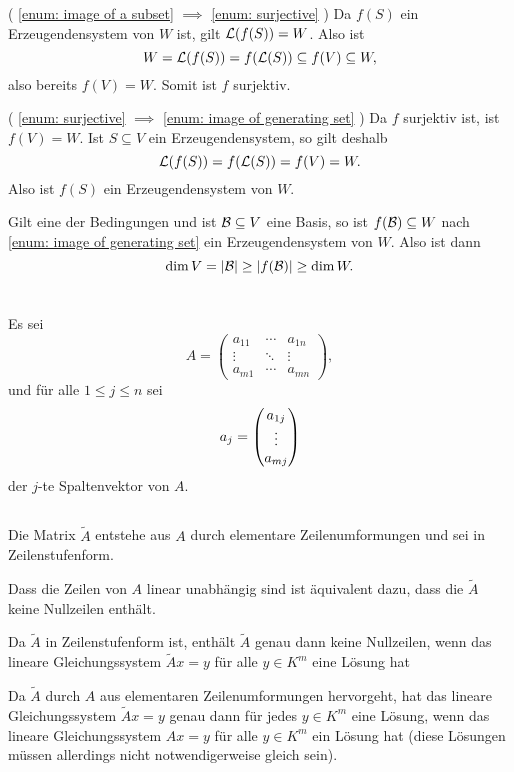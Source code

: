 \documentclass[a4paper,10pt]{scrartcl}
\begin{document}
( \ref{enum: image of a subset} $\implies$ \ref{enum: surjective} ) Da $f(S)$ ein Erzeugendensystem von $W$ ist, gilt $\mathcal{L}(f(S)) = W$. Also ist
\[
 W = \mathcal{L}(f(S)) =  f(\mathcal{L}(S)) \subseteq f(V) \subseteq W,
\]
also bereits $f(V) = W$. Somit ist $f$ surjektiv.

( \ref{enum: surjective} $\implies$ \ref{enum: image of generating set} ) Da $f$ surjektiv ist, ist $f(V) = W$. Ist $S \subseteq V$ ein Erzeugendensystem, so gilt deshalb
\[
 \mathcal{L}(f(S)) = f(\mathcal{L}(S)) = f(V) = W.
\]
Also ist $f(S)$ ein Erzeugendensystem von $W$.

Gilt eine der Bedingungen und ist $\mathcal{B} \subseteq V$ eine Basis, so ist $f(\mathcal{B}) \subseteq W$ nach \ref{enum: image of generating set} ein Erzeugendensystem von $W$. Also ist dann
\[
 \dim V = |\mathcal{B}| \geq |f(\mathcal{B})| \geq \dim W.
\]











\section{}
Es sei
\[
 A =
 \begin{pmatrix}
  a_{11} & \cdots & a_{1n} \\
  \vdots & \ddots & \vdots \\
  a_{m1} & \cdots & a_{mn}
 \end{pmatrix},
\]
und für alle $1 \leq j \leq n$ sei
\[
 a_j = \begin{pmatrix} a_{1j} \\ \vdots \\ a_{mj} \end{pmatrix}
\]
der $j$-te Spaltenvektor von $A$.





\subsection{}
Die Matrix $\tilde{A}$ entstehe aus $A$ durch elementare Zeilenumformungen und sei in Zeilenstufenform.

Dass die Zeilen von $A$ linear unabhängig sind ist äquivalent dazu, dass die $\tilde{A}$ keine Nullzeilen enthält.

Da $\tilde{A}$ in Zeilenstufenform ist, enthält $\tilde{A}$ genau dann keine Nullzeilen, wenn das lineare Gleichungssystem $\tilde{A}x = y$ für alle $y \in K^m$ eine Lösung hat

Da $\tilde{A}$ durch $A$ aus elementaren Zeilenumformungen hervorgeht, hat das lineare Gleichungssystem $\tilde{A}x = y$ genau dann für jedes $y \in K^m$ eine Lösung, wenn das lineare Gleichungssystem $Ax = y$ für alle $y \in K^m$ ein Lösung hat (diese Lösungen müssen allerdings nicht notwendigerweise gleich sein).
\end{document}
